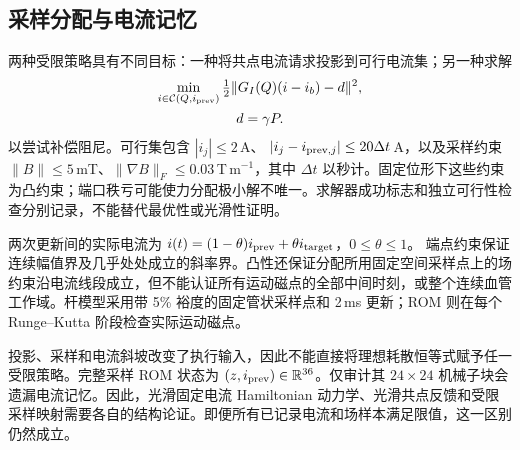 \subsection{采样分配与电流记忆}
两种受限策略具有不同目标：一种将共点电流请求投影到可行电流集；另一种求解
\begin{equation}
\begin{gathered}
 \min_{i\in\mathcal C(Q,i_{\rm prev})}
 \tfrac12\|G_I(Q)(i-i_b)-d\|^2,\\
 d=\gamma P.
\end{gathered}
 \label{eq:force-allocation}
\end{equation}
以尝试补偿阻尼。可行集包含 $|i_j|\leq2$\,A、
$|i_j-i_{{\rm prev},j}|\leq20\Delta t$\,A，以及采样约束
$\|B\|\leq5$\,mT、$\|\nabla B\|_F\leq0.03$\,T\,m$^{-1}$，其中 $\Delta t$ 以秒计。固定位形下这些约束为凸约束；端口秩亏可能使力分配极小解不唯一。求解器成功标志和独立可行性检查分别记录，不能替代最优性或光滑性证明。

两次更新间的实际电流为
$i(t)=(1-\theta)i_{\rm prev}+\theta i_{\rm target}$，$0\leq\theta\leq1$。
端点约束保证连续幅值界及几乎处处成立的斜率界。凸性还保证分配所用固定空间采样点上的场约束沿电流线段成立，但不能认证所有运动磁点的全部中间时刻，或整个连续血管工作域。杆模型采用带 5\% 裕度的固定管状采样点和 2\,ms 更新；ROM 则在每个 Runge--Kutta 阶段检查实际运动磁点。

投影、采样和电流斜坡改变了执行输入，因此不能直接将理想耗散恒等式赋予任一受限策略。完整采样 ROM 状态为 $(z,i_{\rm prev})\in\mathbb R^{36}$。仅审计其 $24\times24$ 机械子块会遗漏电流记忆。因此，光滑固定电流 Hamiltonian 动力学、光滑共点反馈和受限采样映射需要各自的结构论证。即便所有已记录电流和场样本满足限值，这一区别仍然成立。
